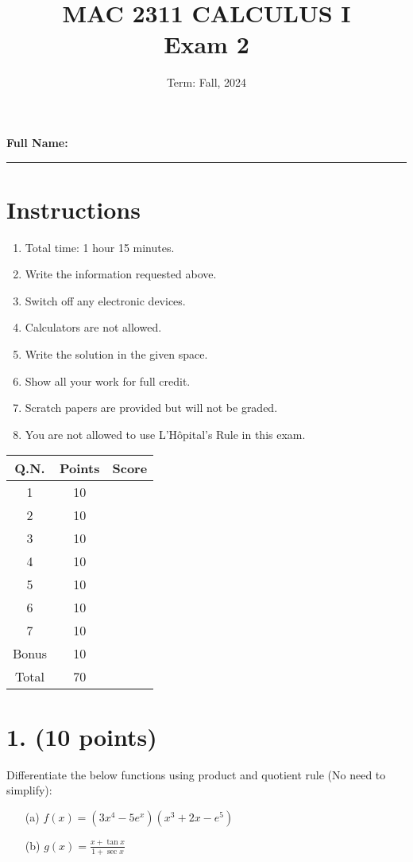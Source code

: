 \documentclass[12pt]{article}
\title{MAC 2311 CALCULUS I \\ Exam 2}
\date{Term: Fall, 2024}
\author{}
\begin{document}
\maketitle

\noindent
\textbf{Full Name:} \rule{10cm}{0.4pt}

\vspace{0.5cm}

\section*{Instructions}
\begin{enumerate}
    \item Total time: 1 hour 15 minutes.
    \item Write the information requested above.
    \item Switch off any electronic devices.
    \item Calculators are not allowed.
    \item Write the solution in the given space.
    \item Show all your work for full credit.
    \item Scratch papers are provided but will not be graded.
    \item You are not allowed to use L'Hôpital’s Rule in this exam.
\end{enumerate}

\vspace{0.5cm}

\noindent
\begin{tabular}{|c|c|c|}
    \hline
    Q.N. & Points & Score \\
    \hline
    1 & 10 & \\
    2 & 10 & \\
    3 & 10 & \\
    4 & 10 & \\
    5 & 10 & \\
    6 & 10 & \\
    7 & 10 & \\
    Bonus & 10 & \\
    \hline
    Total & 70 & \\
    \hline
\end{tabular}

\newpage

\section*{1. (10 points)}
Differentiate the below functions using product and quotient rule (No need to simplify):
\begin{enumerate}
    \item[(a)] \( f(x) = (3x^4 - 5e^x)(x^3 + 2x - e^5) \)
    \item[(b)] \( g(x) = \frac{x + \tan x}{1 + \sec x} \)
\end{enumerate}
\end{document}
